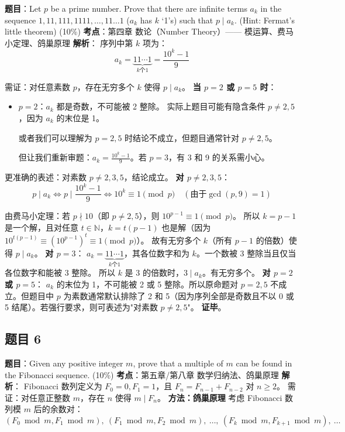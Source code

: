 \documentclass[10pt,a4paper,openany]{ctexbook}
\theoremstyle{definition}
\theoremstyle{remark}
\begin{document}
\textbf{题目}：Let $p$ be a prime number. Prove that there are infinite terms $a_k$ in the sequence $1, 11, 111, 1111, \ldots, 11\ldots1$ ($a_k$ has $k$ `1's) such that $p \mid a_k$. (Hint: Fermat's little theorem) (10\%)
\textbf{考点}：第四章 数论（Number Theory）—— 模运算、费马小定理、鸽巢原理
\textbf{解析}：
序列中第 $k$ 项为：
\[
a_k = \underbrace{11\cdots1}_{k\text{个}1} = \frac{10^k - 1}{9}
\]

需证：对任意素数 $p$，存在无穷多个 $k$ 使得 $p \mid a_k$。
\textbf{当 $p = 2$ 或 $p = 5$ 时}：
\begin{itemize}
\item $p = 2$：$a_k$ 都是奇数，不可能被 2 整除。
实际上题目可能有隐含条件 $p \neq 2, 5$，因为 $a_k$ 的末位是 1。

或者我们可以理解为 $p = 2, 5$ 时结论不成立，但题目通常针对 $p \neq 2, 5$。


但让我们重新审题：$a_k = \frac{10^k - 1}{9}$。若 $p = 3$，有 3 和 9 的关系需小心。


\end{itemize}

更准确的表述：对素数 $p \neq 2, 3, 5$，结论成立。
\textbf{对 $p \neq 2, 3, 5$}：
\[
p \mid a_k \iff p \mid \frac{10^k - 1}{9} \iff 10^k \equiv 1 \pmod{p} \quad (\text{由于} \gcd(p,9)=1)
\]

由费马小定理：若 $p \nmid 10$（即 $p \neq 2, 5$），则 $10^{p-1} \equiv 1 \pmod{p}$。
所以 $k = p-1$ 是一个解，且对任意 $t \in \mathbb{N}$，$k = t(p-1)$ 也是解（因为 $10^{t(p-1)} \equiv (10^{p-1})^t \equiv 1 \pmod{p}$）。
故有无穷多个 $k$（所有 $p-1$ 的倍数）使得 $p \mid a_k$。
\textbf{对 $p = 3$}：
$a_k = \underbrace{11\cdots1}_{k\text{个}1}$，其各位数字和为 $k$。一个数被 3 整除当且仅当各位数字和能被 3 整除。
所以 $k$ 是 3 的倍数时，$3 \mid a_k$。有无穷多个。
\textbf{对 $p = 2$ 或 $p = 5$}：
$a_k$ 的末位为 1，不可能被 2 或 5 整除。所以原命题对 $p=2,5$ 不成立。但题目中 $p$ 为素数通常默认排除了 2 和 5（因为序列全部是奇数且不以 0 或 5 结尾）。若强行要求，则可表述为"对素数 $p \neq 2,5$"。
\textbf{证毕}。
\vspace{-2pt}

\subsection{题目 6}

\textbf{题目}：Given any positive integer $m$, prove that a multiple of $m$ can be found in the Fibonacci sequence. (10\%)
\textbf{考点}：第五章/第八章 数学归纳法、鸽巢原理
\textbf{解析}：
Fibonacci 数列定义为 $F_0 = 0, F_1 = 1$，且 $F_{n} = F_{n-1} + F_{n-2}$ 对 $n \geq 2$。
需证：对任意正整数 $m$，存在 $n$ 使得 $m \mid F_n$。
\textbf{方法：鸽巢原理}
考虑 Fibonacci 数列模 $m$ 后的余数对：
\[
(F_0 \bmod m, F_1 \bmod m),\ (F_1 \bmod m, F_2 \bmod m),\ \ldots,\ (F_k \bmod m, F_{k+1} \bmod m),\ \ldots
\]
\end{document}

